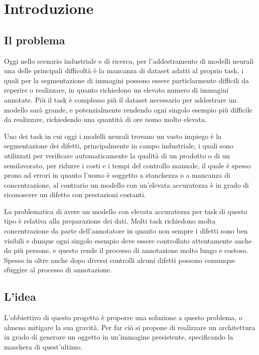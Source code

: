 \chapter{Introduzione}


\section{Il problema \ok}
\begin{comment}

\end{comment}
Oggi nello scenario industriale e di ricerca, per l'addestramento di modelli neurali una delle 
principali difficoltà è la mancanza di dataset adatti al proprio task, i quali per la segmentazione di immagini possono
essere particlarmente difficili da reperire o realizzare, in quanto richiedono un elevato numero di immagini annotate.
Più il task è complesso più il dataset necessario per addestrare un modello sarà grande,
e potenzialmente rendendo ogni singolo esempio più difficile da realizzare, richiedendo una quantità di ore uomo molto elevata.

Uno dei task in cui oggi i modelli neurali trovano un vasto impiego è la segmentazione dei difetti, principalmente in campo industriale,
i quali sono utilizzati per verificare automaticamente la qualità di un prodotto o di un semilavorato, per ridurre i costi e i tempi del controllo manuale,
il quale è spesso prono ad errori in quanto l'uomo è soggetto a stanchezza o a mancanza di concentrazione,
al contrario un modello con un'elevata accuratezza è in grado di riconoscere un difetto con prestazioni costanti.

La problematica di avere un modello con elevata accuratezza per task di questo tipo è relativa alla preparazione dei dati.
Molti task richiedono molta concentrazione da parte dell'annotatore in quanto non sempre i difetti sono ben visibili e dunque ogni singolo
esempio deve essere controllato attentamente anche da più persone, e questo rende il processo di annotazione molto lungo e costoso.
Spesso in oltre anche dopo diversi controlli alcuni difetti possono comunque sfuggire al processo di annotazione.


\section{L'idea \ok}
\begin{comment}
Realizzare un architettura in grado di generare un buona quantità di dati annotati a partire da una quantità ridotta.
TODO: linka paper google su "copy paste technique"
\end{comment}
L'obbiettivo di questo progetto è proporre una soluzione a questo problema, o almeno mitigare la sua gravità.
Per far ciò si propone di realizzare un architettura in grado di generare un oggetto in un'immagine presistente, specificando la maschera di quest'ultimo.

